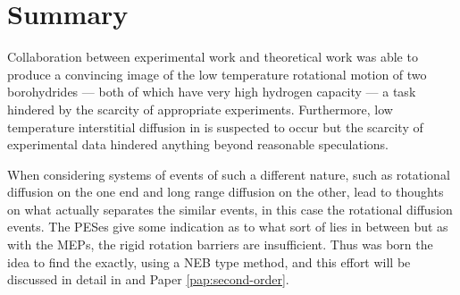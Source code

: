 \section{Summary}
\label{sec:borohydrides-summary}
Collaboration between experimental work and theoretical work was able to produce a convincing image of the low temperature rotational motion of two borohydrides --- both of which have very high hydrogen capacity --- a task hindered by the scarcity of appropriate experiments.
Furthermore, low temperature  interstitial diffusion in  is suspected to occur but the scarcity of experimental data hindered anything beyond reasonable speculations.

When considering systems of events of such a different nature, such as rotational diffusion on the one end and long range diffusion on the other, lead to thoughts on what actually separates the similar events, in this case the rotational diffusion events.
The PESes give some indication as to what sort of  lies in between but as with the MEPs, the rigid rotation barriers are insufficient.
Thus was born the idea to find the  exactly, using a NEB type method, and this effort will be discussed in detail in  and Paper \ref{pap:second-order}.

